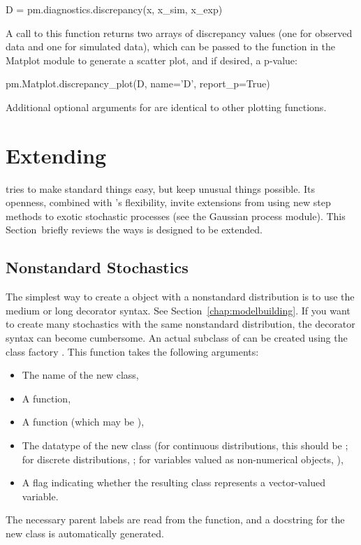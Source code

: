 \documentclass[]{jss}
\begin{document}
\begin{CodeInput}
D = pm.diagnostics.discrepancy(x, x_sim, x_exp)
\end{CodeInput}

A call to this function returns two arrays of discrepancy values (one for observed data and one for simulated data), which can be passed to the  function in the Matplot module to generate a scatter plot, and if desired, a p-value:

\begin{CodeInput}
pm.Matplot.discrepancy_plot(D, name='D', report_p=True)
\end{CodeInput}

Additional optional arguments for  are identical to other  plotting functions.





\section[Extending PyMC]{Extending }
\label{chap:extending}
 tries to make standard things easy, but keep unusual things possible. Its openness, combined with 's flexibility, invite extensions from using new step methods to exotic stochastic processes (see the Gaussian process module). This Section~briefly reviews the ways  is designed to be extended.


\subsection{Nonstandard Stochastics} \label{nonstandard}


The simplest way to create a  object with a nonstandard distribution is to use the medium or long decorator syntax. See Section~\ref{chap:modelbuilding}. If you want to create many stochastics with the same nonstandard distribution, the decorator syntax can become cumbersome. An actual subclass of  can be created using the class factory . This function takes the following arguments:
\begin{itemize}
   \item The name of the new class,
   \item A  function,
   \item A  function (which may be ),
   \item The  datatype of the new class (for continuous distributions, this should be ; for discrete distributions, ; for variables valued as non-numerical objects, ),
   \item A flag indicating whether the resulting class represents a vector-valued variable.
\end{itemize}
The necessary parent labels are read from the  function, and a docstring for the new class is automatically generated.
\end{document}
